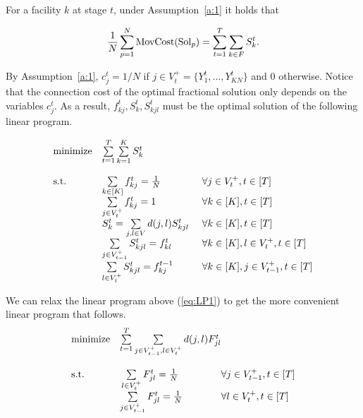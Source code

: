 \begin{lemma}\label{l:moving_cost}
For a facility $k$ at stage $t$, under Assumption~\ref{a:1} it holds that

\[
\frac{1}{N}\sum_{p=1}^N \mathrm{MovCost}(\mathrm{Sol}_p) = \sum_{t=1}^T\sum_{k\in F} S_k^t.
\]
\end{lemma}
\begin{proof2}
By Assumption~\ref{a:1}, $c_j^t=1/N$ if $j\in V_t^+= \{Y_1^t,\ldots,Y_{KN}^t\}$
and $0$ otherwise. Notice that the connection cost of the optimal fractional 
solution only depends on the
variables $c_j^t$. As a result, $f_{k j}^t,S_k^t,S_{k j l}^t$ must be the optimal 
solution of the following linear program.


\begin{equation}\label{eq:LP1}
\begin{array}{ll@{}ll}
\text{minimize}  &  \sum \limits_{t=1}^{T}\sum \limits_{k=1}^KS_k^t\\
& \\
\text{s.t.}& \sum\limits_{k \in [K] }f^t_{kj}=\frac{1}{N}   & \,\,\,\,\,\,\,\, \forall j \in V_t^+,t\in [T] 
\\
        &\sum \limits_{j \in V_t^+} f_{kj}^t=1 & \,\,\,\,\,\,\,\, \forall k\in [K], t \in [T]\\
        &S_k^t = \sum \limits_{j,l \in V} d(j,l)S_{kjl}^t & \,\,\,\,\,\,\,\, \forall k \in [K], t\in [T] \\
        &\sum \limits_{j \in V_{t-1}^+} S_{kjl}^t =f_{kl}^t 
        & \,\,\,\,\,\,\,\, \forall k \in [K],l \in 
        V_t^+,t\in [T]\\
        &\sum \limits_{l \in V_t^+} S_{kjl}^t = f_{kj}^{t-1} 
        & \,\,\,\,\,\,\,\, \forall k \in [K],j \in 
        V_{t-1}^+,t\in [T]\\
\end{array}
\end{equation}
\medskip

\noindent We can relax the linear program above (\ref{eq:LP1}) to get the more convenient linear program that follows. 
\begin{equation}\label{eq:LP2}
\begin{array}{ll@{}ll}
\text{minimize}  &  \sum \limits_{t=1}^T\sum \limits_{j \in V_{t-1}^+,l \in V_t^+} 
d(j,l)F_{jl}^t\\
& \\
\text{s.t.}& \, \sum\limits_{l \in V_t^+}F^t_{jl}=\frac{1}{N}   & \forall j \in V_{t-1}^+,t\in 
[T] \\
& \sum \limits_{j \in V_{t-1}^+} F^t_{jl}=\frac{1}{N} & \forall l\in V_t^+, t\in [T] \\
\end{array}
\end{equation}
\medskip


\end{proof2}
